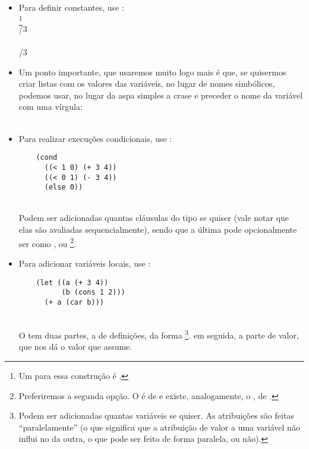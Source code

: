 \documentclass{article}
\begin{document}
\begin{itemize}
\item Para definir constantes, use :\\
  \footnote{Um
     para essa construção é
    .}\\
   /3\\
  \\
   /3

\item  Um ponto importante, que usaremos muito logo mais é que, se
  quisermos criar listas com os valores das variáveis, no lugar de
  nomes simbólicos, podemos usar, no lugar da aspa simples a crase e
  preceder o nome da variável com uma vírgula:\\
  \\
   \seta {}

\item Para realizar execuções condicionais, use :\\
  \begin{lstlisting}
    (cond
      ((< 1 0) (+ 3 4))
      ((< 0 1) (- 3 4))
      (else 0))
  \end{lstlisting}
  \hspace{1cm} \\
  
  Podem ser adicionadas quantas cláusulas do tipo
   se quiser (vale notar que elas são
  avaliadas sequencialmente), sendo que a última pode
  opcionalmente ser como , ou \footnote{Preferiremos a segunda opção. O
     é de  e existe, analogamente, o
    , de .}.

\item Para adicionar variáveis locais, use :
  \begin{lstlisting}
    (let ((a (+ 3 4))
          (b (cons 1 2)))
      (+ a (car b)))
  \end{lstlisting}
  \hspace{1cm} \\
  O  tem duas partes, a de definições, da forma
  \footnote{Podem ser adicionadas quantas variáveis se
    quiser. As atribuições são feitas ``paralelamente'' (o que
    significa que a atribuição de valor a uma variável não influi no
    da outra, o que pode ser feito de forma paralela, ou não).}.
  em seguida, a parte de valor, que nos dá o valor que 
  assume.  
\end{itemize}
\end{document}
